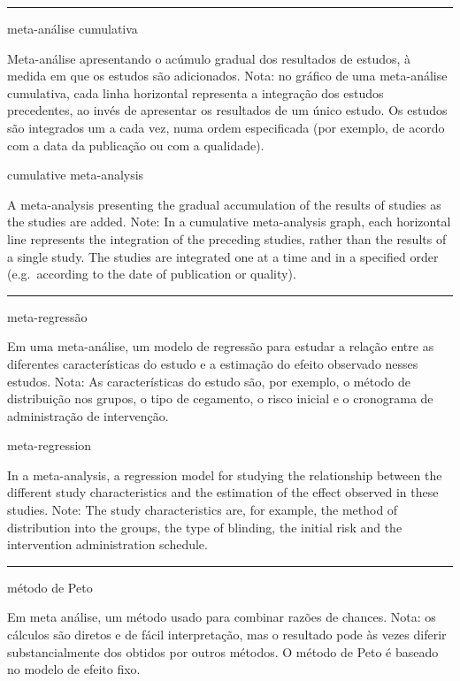 \documentclass[
  openany]{book}
\begin{document}
\begin{center}\rule{0.5\linewidth}{0.5pt}\end{center}

meta-análise cumulativa

Meta-análise apresentando o acúmulo gradual dos resultados de estudos, à medida em que os estudos são adicionados. Nota: no gráfico de uma meta-análise cumulativa, cada linha horizontal representa a integração dos estudos precedentes, ao invés de apresentar os resultados de um único estudo. Os estudos são integrados um a cada vez, numa ordem especificada (por exemplo, de acordo com a data da publicação ou com a qualidade).

cumulative meta-analysis

A meta-analysis presenting the gradual accumulation of the results of studies as the studies are added. Note: In a cumulative meta-analysis graph, each horizontal line represents the integration of the preceding studies, rather than the results of a single study. The studies are integrated one at a time and in a specified order (e.g.~according to the date of publication or quality).

\begin{center}\rule{0.5\linewidth}{0.5pt}\end{center}

meta-regressão

Em uma meta-análise, um modelo de regressão para estudar a relação entre as diferentes características do estudo e a estimação do efeito observado nesses estudos. Nota: As características do estudo são, por exemplo, o método de distribuição nos grupos, o tipo de cegamento, o risco inicial e o cronograma de administração de intervenção.

meta-regression

In a meta-analysis, a regression model for studying the relationship between the different study characteristics and the estimation of the effect observed in these studies. Note: The study characteristics are, for example, the method of distribution into the groups, the type of blinding, the initial risk and the intervention administration schedule.

\begin{center}\rule{0.5\linewidth}{0.5pt}\end{center}

método de Peto

Em meta análise, um método usado para combinar razões de chances. Nota: os cálculos são diretos e de fácil interpretação, mas o resultado pode às vezes diferir substancialmente dos obtidos por outros métodos. O método de Peto é baseado no modelo de efeito fixo.
\end{document}
